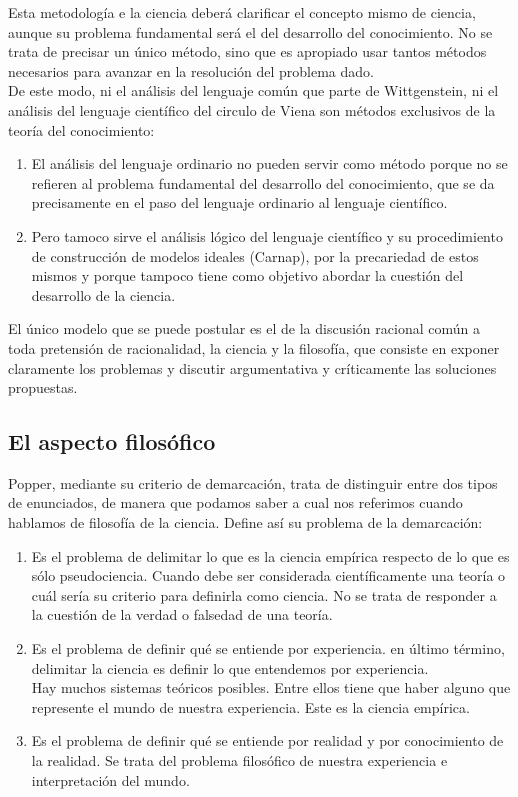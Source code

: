\documentclass[a4paper, 11pt, twocolumn, spanish]{article}
\begin{document}
Esta metodología e la ciencia deberá clarificar el concepto mismo de
ciencia, aunque su problema fundamental será el del desarrollo del
conocimiento. No se trata de precisar un único método, sino que es
apropiado usar tantos métodos necesarios para avanzar en la resolución
del problema dado.\\[0pt]
De este modo, ni el análisis del lenguaje común que parte de
Wittgenstein, ni el análisis del lenguaje científico del circulo de
Viena son métodos exclusivos de la teoría del conocimiento:
\begin{enumerate}
\item El análisis del lenguaje ordinario no pueden servir como método
porque no se refieren al problema fundamental del desarrollo del
conocimiento, que se da precisamente en el paso del lenguaje
ordinario al lenguaje científico.
\item Pero tamoco sirve el análisis lógico del lenguaje científico y su
procedimiento de construcción de modelos ideales (Carnap), por la
precariedad de estos mismos y porque tampoco tiene como objetivo
abordar la cuestión del desarrollo de la ciencia.
\end{enumerate}

El único modelo que se puede postular es el de la discusión racional
común a toda pretensión de racionalidad, la ciencia y la filosofía,
que consiste en exponer claramente los problemas y discutir
argumentativa y críticamente las soluciones propuestas.

\subsection{El aspecto filosófico}
\label{sec:orga060c8d}
Popper, mediante su criterio de demarcación, trata de distinguir entre
dos tipos de enunciados, de manera que podamos saber a cual nos
referimos cuando hablamos de filosofía de la ciencia. Define así su
problema de la demarcación:
\begin{enumerate}
\item Es el problema de delimitar lo que es la ciencia empírica respecto
de lo que es sólo pseudociencia. Cuando debe ser considerada
científicamente una teoría o cuál sería su criterio para
definirla como ciencia. No se trata de responder a la cuestión de
la verdad o falsedad de una teoría.
\item Es el problema de definir qué se entiende por experiencia. en
último término, delimitar la ciencia es definir lo que entendemos
por experiencia.\\[0pt]
Hay muchos sistemas teóricos posibles. Entre ellos tiene que
haber alguno que represente el mundo de nuestra experiencia. Este
es la ciencia empírica.
\item Es el problema de definir qué se entiende por realidad y por
conocimiento de la realidad. Se trata del problema filosófico de
nuestra experiencia e interpretación del mundo.
\end{enumerate}
\end{document}
